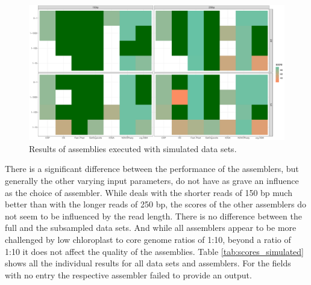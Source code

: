 \begin{figure}[H]
\centering
\includegraphics[height=.55\textheight, width=.99\textwidth]{Figures/sim_tiles}
\decoRule
\caption[Score of assemblies of simulated data sets]{Results of assemblies executed with simulated data sets.}
\label{fig:sim_tiles}
\end{figure}

There is a significant difference between the performance of the assemblers, but generally the other varying
input parameters, do not have as grave an influence as the choice of assembler. While \fp \hspace{0.5ex} deals
with the shorter reads of 150 bp much better than with the longer reads of 250 bp, the scores of the other
assemblers do not seem to be influenced by the read length. There is no difference between the full and the
subsampled data sets. And while all assemblers appear to be more challenged by low chloroplast to core genome
ratios of 1:10, beyond a ratio of 1:10 it does not affect the quality of the assemblies. Table
\ref{tab:scores_simulated} shows all the individual results for all data sets and assemblers. For the fields
with no entry the respective assembler failed to provide an output.

